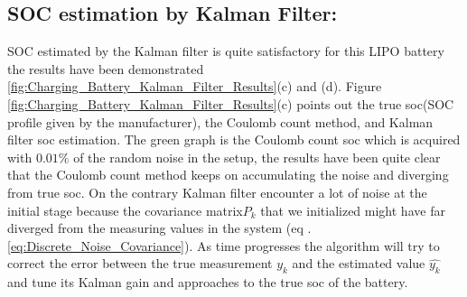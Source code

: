 \subsection{SOC estimation by Kalman Filter:}
SOC estimated by the Kalman filter is quite satisfactory for this LIPO battery the results have been demonstrated \ref{fig:Charging_Battery_Kalman_Filter_Results}(c) and (d). Figure \ref{fig:Charging_Battery_Kalman_Filter_Results}(c) points out the true soc(SOC profile given by the manufacturer), the Coulomb count method, and Kalman filter soc estimation. The green graph is the Coulomb count soc which is acquired with $0.01\%$ of the random noise in the setup, the results have been quite clear that the Coulomb count method keeps on accumulating the noise and diverging from true soc.
On the contrary Kalman filter encounter a lot of noise at the initial stage because the covariance matrix$P_k$ that we initialized might have far diverged from the measuring values in the system (eq . \ref{eq:Discrete_Noise_Covariance}). As time progresses the algorithm will try to correct the error between the true measurement $y_k$ and the estimated value $\hat{y_k}$ and tune its Kalman gain and approaches to the true soc of the battery.

